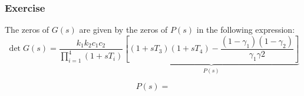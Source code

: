 \subsubsection{Exercise}

The zeros of $G(s)$ are given by the zeros of $P(s)$ in the following expression:
$$
\det G(s) = \frac{k_1k_2c_1c_2}{\prod_{i=1}^{4} (1 + s T_i)}
\underbrace{\left[ (1+sT_3)(1+sT_4) - \frac{(1-\gamma_1)(1 - \gamma_2)}{\gamma_1\gamma2}\right]}_{P(s)}
$$

$$
P(s) = 
$$


